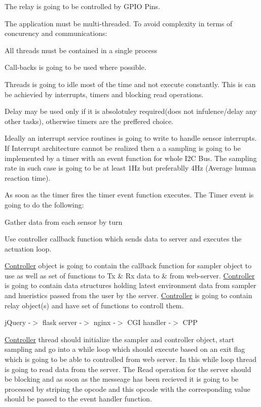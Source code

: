 The relay is going to be controlled by G\+P\+IO Pins.

The application must be multi-\/threaded. To avoid complexity in terms of concurency and communications\+:
\begin{DoxyEnumerate}
\item All threads must be contained in a single process
\item Call-\/backs is going to be used where possible.
\end{DoxyEnumerate}

Threads is going to idle most of the time and not execute constantly. This is can be achievied by interrupts, timers and blocking read operations.

Delay may be used only if it is absolotuley required(does not infulence/delay any other tasks), otherwise timers are the preffered choice.

Ideally an interrupt service routines is going to write to handle sensor interrupts. If Interrupt architecture cannot be realized then a a sampling is going to be implemented by a timer with an event function for whole I2C Bus. The sampling rate in such case is going to be at least 1\+Hz but preferablly 4\+Hz (Average human reaction time).

As soon as the timer fires the timer event function executes. The Timer event is going to do the following\+:
\begin{DoxyEnumerate}
\item Gather data from each sensor by turn
\item Use controller callback function which sends data to server and executes the actuation loop.
\end{DoxyEnumerate}

\hyperlink{classController}{Controller} object is going to contain the callback function for sampler object to use as well as set of functions to Tx \& Rx data to \& from web-\/server. \hyperlink{classController}{Controller} is going to contain data structures holding latest environment data from sampler and hueristics passed from the user by the server. \hyperlink{classController}{Controller} is going to contain relay object(s) and have set of functions to controll them.

j\+Query -\/$>$ flask server -\/$>$ nginx -\/$>$ C\+GI handler -\/$>$ C\+PP

\hyperlink{classController}{Controller} thread should initialize the sampler and controller object, start sampling and go into a while loop which should execute based on an exit flag which is going to be able to controlled from web server. In this while loop thread is going to read data from the server. The Read operation for the server should be blocking and as soon as the messeage has been recieved it is going to be processed by striping the opcode and this opcode with the corresponding value should be passed to the event handler function.

